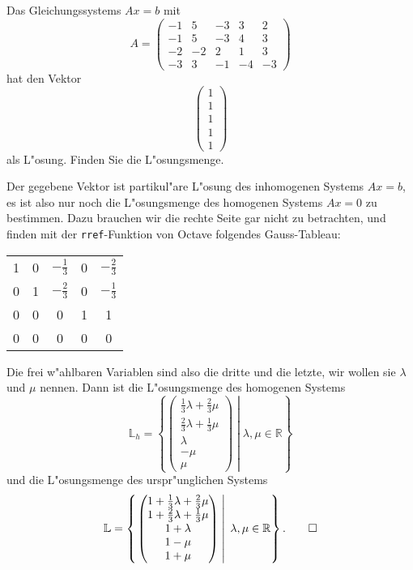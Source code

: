 Das Gleichungssystems $Ax=b$ mit
\[
A=\begin{pmatrix}
-1& 5&-3& 3& 2\\
-1& 5&-3& 4& 3\\
-2&-2& 2& 1& 3\\
-3& 3&-1&-4&-3
\end{pmatrix}
\]
hat den Vektor
\[
\begin{pmatrix}1\\1\\1\\1\\1\end{pmatrix}
\]
als L"osung.
Finden Sie die L"osungsmenge.

\begin{loesung}
Der gegebene Vektor ist partikul"are L"osung des inhomogenen Systems
$Ax=b$, es ist also nur noch die L"osungsmenge des homogenen Systems
$Ax=0$ zu bestimmen.
Dazu brauchen wir die rechte Seite gar nicht zu betrachten,
und finden mit der {\tt rref}-Funktion von Octave folgendes Gauss-Tableau:
\begin{center}
\begin{tabular}{|ccccc|}
\hline
1&0&$-\frac13$&0&$-\frac23$\\
0&1&$-\frac23$&0&$-\frac13$\\
0&0&         0&1&1\\
0&0&         0&0&0\\
\hline
\end{tabular}
\end{center}
Die frei w"ahlbaren Variablen sind also die dritte und die letzte,
wir wollen sie $\lambda$ und $\mu$ nennen. Dann ist die L"osungsmenge
des homogenen Systems
\[
{\mathbb L}_h
=
\left\{
\left.
\begin{pmatrix}
\frac13\lambda+\frac23\mu\\
\frac23\lambda+\frac13\mu\\
\lambda\\
-\mu\\
\mu
\end{pmatrix}
\;
\right|
\;
\lambda,\mu\in\mathbb R
\right\}
\]
und die L"osungsmenge des urspr"unglichen Systems
\[
{\mathbb L}
=
\left\{
\left.
\begin{pmatrix}
1+\frac13\lambda+\frac23\mu\\
1+\frac23\lambda+\frac13\mu\\
1+\lambda\\
1-\mu\\
1+\mu
\end{pmatrix}
\;
\right|
\;
\lambda,\mu\in\mathbb R
\right\}.
\qedhere
\]
\end{loesung}
